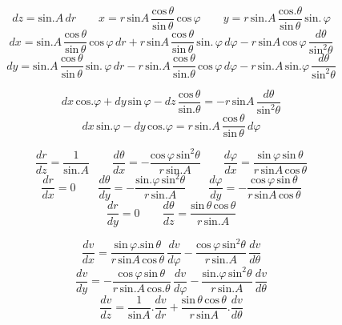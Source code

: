 \documentclass[11pt,a4paper]{article}
\begin{document}
\[ dz = \text{sin.}A\,dr \qquad x = r\,\text{sin}A\,\frac{\text{cos}\,\theta}{\text{sin}\,\theta}\,\text{cos}\,\varphi \qquad y = r\,\text{sin.}A\,\frac{\text{cos.}\theta}{\text{sin}\,\theta}\,\text{sin.}\,\varphi \]
\[ dx = \text{sin.}A\,\frac{\text{cos}\,\theta}{\text{sin}\,\theta}\,\text{cos}\,\varphi\,dr + r\,\text{sin}A\,\frac{\text{cos}\,\theta}{\text{sin}\,\theta}\,\text{sin.}\,\varphi\,d\varphi - r\,\text{sin}A\,\text{cos}\,\varphi\,\frac{d\theta}{\text{sin}^{2}\theta} \]
\[ dy = \text{sin.}A\,\frac{\text{cos}\,\theta}{\text{sin}\,\theta}\,\text{sin.}\,\varphi\,dr - r\,\text{sin.}A\,\frac{\text{cos}\,\theta}{\text{sin.}\theta}\,\text{cos}\,\varphi\,d\varphi - r\,\text{sin.}A\,\text{sin.}\varphi\,\frac{d\theta}{\text{sin}^{2}\theta} \]

\[ dx\,\text{cos.}\varphi + dy\,\text{sin}\,\varphi - dz\,\frac{\text{cos}\,\theta}{\text{sin.}\theta} = -r\,\text{sin}A\,\frac{d\theta}{\text{sin}^{2}\theta} \]
\[ dx\,\text{sin.}\varphi - dy\,\text{cos.}\varphi = r\,\text{sin.}A\,\frac{\text{cos}\,\theta}{\text{sin}\,\theta}\,d\varphi \]

\[ \frac{dr}{dz} = \frac{1}{\text{sin.}A} \qquad \frac{d\theta}{dx} = -\frac{\text{cos}\,\varphi\,\text{sin}^{2}\theta}{r\,\text{sin.}A} \qquad \frac{d\varphi}{dx} = \frac{\text{sin}\,\varphi\,\text{sin}\,\theta}{r\,\text{sin}A\,\text{cos}\,\theta} \]
\[ \frac{dr}{dx} = 0 \qquad \frac{d\theta}{dy} = -\frac{\text{sin.}\varphi\,\text{sin}^{2}\theta}{r\,\text{sin.}A} \qquad \frac{d\varphi}{dy} = -\frac{\text{cos}\,\varphi\,\text{sin}\,\theta}{r\,\text{sin}A\,\text{cos}\,\theta} \]
\[ \frac{dr}{dy} = 0 \qquad \frac{d\theta}{dz} = \frac{\text{sin}\,\theta\,\text{cos}\,\theta}{r\,\text{sin.}A} \]

\[ \frac{dv}{dx} = \frac{\text{sin}\,\varphi.\text{sin}\,\theta}{r\,\text{sin}A\,\text{cos}\,\theta}\,\frac{dv}{d\varphi} - \frac{\text{cos}\,\varphi\,\text{sin}^{2}\theta}{r\,\text{sin.}A}\,\frac{dv}{d\theta} \]
\[ \frac{dv}{dy} = -\frac{\text{cos}\,\varphi\,\text{sin}\,\theta}{r\,\text{sin.}A\,\text{cos.}\theta}\,\frac{dv}{d\varphi} - \frac{\text{sin.}\varphi\,\text{sin}^{2}\theta}{r\,\text{sin.}A}\,\frac{dv}{d\theta} \]
\[ \frac{dv}{dz} = \frac{1}{\text{sin}A}.\frac{dv}{dr} + \frac{\text{sin}\,\theta\,\text{cos}\,\theta}{r\,\text{sin}A}.\frac{dv}{d\theta} \]
\end{document}
